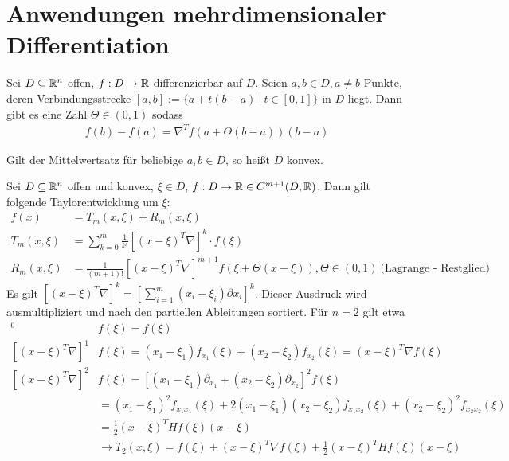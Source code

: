 \pagebreak

\section{Anwendungen mehrdimensionaler Differentiation}

\begin{satz}[Mittelwertsatz]
	Sei $D \subseteq \mathbb{R}^n$ offen, $f : D \rightarrow \mathbb{R}$ differenzierbar auf $D$. Seien $a,b \in D, a \neq b$ Punkte, deren Verbindungsstrecke $[a,b] := \{ a + t(b - a) \medspace | \medspace t \in [0,1] \}$ in $D$ liegt. Dann gibt es eine Zahl $\Theta \in (0,1)$ sodass 
	\begin{align*}
		f(b) - f(a) = \nabla^T f(a + \Theta (b-a)) (b - a)
	\end{align*}
\end{satz}

\begin{definition}
	Gilt der Mittelwertsatz für beliebige $a,b \in D$, so heißt $D$ konvex.
\end{definition}

\begin{satz}
	Sei $D \subseteq \mathbb{R}^n$ offen und konvex, $\xi \in D$, $f : D \rightarrow \mathbb{R} \in C^{m+1}(D,\mathbb{R})$. Dann gilt folgende Taylorentwicklung um $\xi$:
	\begin{align*}
		f(x) &= T_m(x, \xi) + R_m(x, \xi) \\
		T_m(x, \xi) &= \sum_{k=0}^{m} \frac{1}{k!} [(x-\xi)^T \nabla]^k \cdot f(\xi) \\
		R_m(x, \xi) &= \frac{1}{(m+1)!} [(x-\xi)^T \nabla]^{m+1} f(\xi + \Theta (x - \xi)), \Theta \in (0,1) \medspace \text{(Lagrange - Restglied)}
	\end{align*}
	Es gilt $[(x-\xi)^T\nabla]^k = [\sum_{i=1}^{m} (x_i - \xi_i) \partial{x_i}]^k$. Dieser Ausdruck wird ausmultipliziert und nach den partiellen Ableitungen sortiert. Für $n = 2$ gilt etwa	
	\begin{align*}
		[(x- \xi)^T \nabla]^0 &f(\xi) = f(\xi) \\
		[(x- \xi)^T \nabla]^1 &f(\xi) = (x_1 - \xi_1) f_{x_1}(\xi) + (x_2 - \xi_2) f_{x_2}(\xi) = (x - \xi)^T \nabla f(\xi) \\
		[(x- \xi)^T \nabla]^2 &f(\xi) = [(x_1 - \xi_1) \partial_{x_1} + (x_2 - \xi_2) \partial_{x_2}]^2 f(\xi) \\ &= (x_1 - \xi_1)^2  f_{x_1 x_1}(\xi) + 2 (x_1 - \xi_1) (x_2 - \xi_2) f_{x_1 x_2}(\xi)	+ (x_2 - \xi_2)^2 f_{x_2 x_2}(\xi) \\ &= \frac{1}{2} (x - \xi)^T H f(\xi) (x - \xi) \\
		&\rightarrow T_2(x,\xi) = f(\xi) + (x - \xi)^T \nabla f(\xi) + \frac{1}{2} (x- \xi)^T Hf(\xi) (x- \xi)
	\end{align*}	
\end{satz}

